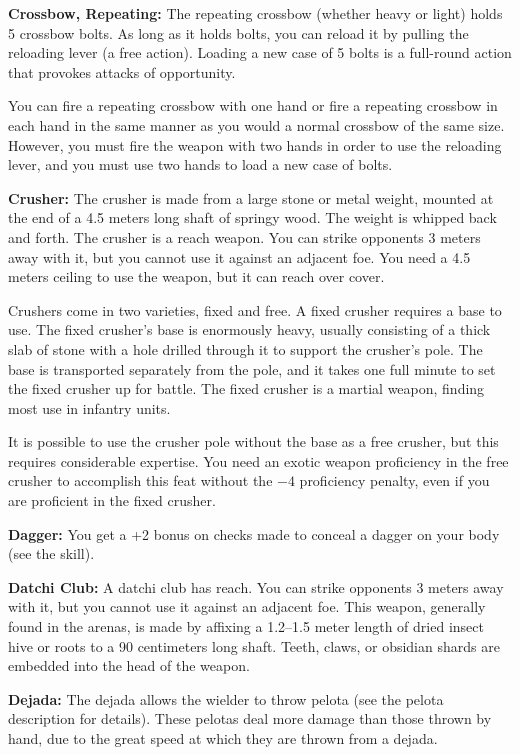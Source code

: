 \textbf{Crossbow, Repeating:} The repeating crossbow (whether heavy or light) holds 5 crossbow bolts. As long as it holds bolts, you can reload it by pulling the reloading lever (a free action). Loading a new case of 5 bolts is a full-round action that provokes attacks of opportunity.

You can fire a repeating crossbow with one hand or fire a repeating crossbow in each hand in the same manner as you would a normal crossbow of the same size. However, you must fire the weapon with two hands in order to use the reloading lever, and you must use two hands to load a new case of bolts.

\textbf{Crusher:} The crusher is made from a large stone or metal weight, mounted at the end of a 4.5 meters long shaft of springy wood. The weight is whipped back and forth. The crusher is a reach weapon. You can strike opponents 3 meters away with it, but you cannot use it against an adjacent foe. You need a 4.5 meters ceiling to use the weapon, but it can reach over cover.

Crushers come in two varieties, fixed and free. A fixed crusher requires a base to use. The fixed crusher's base is enormously heavy, usually consisting of a thick slab of stone with a hole drilled through it to support the crusher's pole. The base is transported separately from the pole, and it takes one full minute to set the fixed crusher up for battle. The fixed crusher is a martial weapon, finding most use in infantry units.

It is possible to use the crusher pole without the base as a free crusher, but this requires considerable expertise. You need an exotic weapon proficiency in the free crusher to accomplish this feat without the $-4$ proficiency penalty, even if you are proficient in the fixed crusher.

\textbf{Dagger:} You get a +2 bonus on  checks made to conceal a dagger on your body (see the  skill). 

\textbf{Datchi Club:} A datchi club has reach. You can strike opponents 3 meters away with it, but you cannot use it against an adjacent foe. This weapon, generally found in the arenas, is made by affixing a 1.2--1.5 meter length of dried insect hive or roots to a 90 centimeters long shaft. Teeth, claws, or obsidian shards are embedded into the head of the weapon.

\textbf{Dejada:} The dejada allows the wielder to throw pelota (see the pelota description for details). These pelotas deal more damage than those thrown by hand, due to the great speed at which they are thrown from a dejada.

